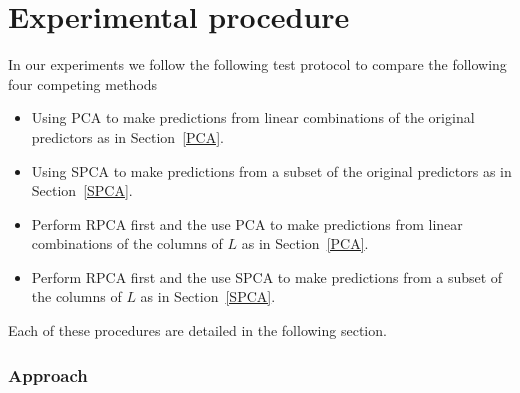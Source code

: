 \documentclass[conference]{IEEEtran}
\begin{document}
\section{Experimental procedure}
In our experiments we follow the following test protocol to compare the following four competing methods
\begin{itemize}
    \item Using PCA to make predictions from linear combinations of the original predictors as in Section~\ref{PCA}.
    \item Using SPCA to make predictions from a subset of the original predictors as in Section~\ref{SPCA}.
    \item Perform RPCA first and the use PCA to make predictions from linear combinations of the columns of $L$ as in Section~\ref{PCA}.
    \item Perform RPCA first and the use SPCA to make predictions from a subset of the columns of $L$ as in Section~\ref{SPCA}.
\end{itemize}

Each of these procedures are detailed in the following section.


\subsubsection{Approach}


\end{document}
